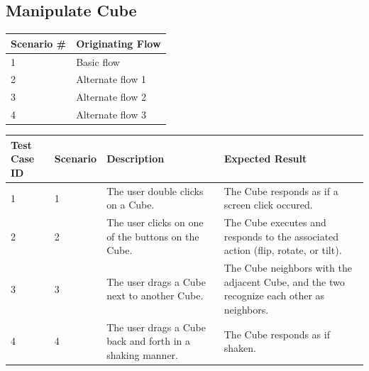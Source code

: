 \documentclass[12pt]{article}
\begin{document}
\clearpage

\subsection{Manipulate Cube}

\begin{table}[h!]
  \begin{tabular}{l | l}
    \textbf{Scenario \#} &
    \textbf{Originating Flow} \\ \hline

    1 &
    Basic flow \\ \hline

    2 &
    Alternate flow 1 \\ \hline

    3 &
    Alternate flow 2 \\ \hline

    4 &
    Alternate flow 3 \\ \hline

  \end{tabular}
\end{table}

\begin{table}[h!]
  \begin{tabular}{p{.5in} | p{.75in} | p{2.15in} | p{2.15in}}
    \textbf{Test Case ID} &
    \textbf{Scenario} &
    \textbf{Description} &
    \textbf{Expected Result} \\ \hline

    1 &
    1 &
    The user double clicks on a Cube. &
    The Cube responds as if a screen click occured. \\ \hline

    2 &
    2 &
    The user clicks on one of the buttons on the Cube. &
    The Cube executes and responds to the associated action (flip, rotate, or tilt). \\ \hline

    3 &
    3 &
    The user drags a Cube next to another Cube. &
    The Cube neighbors with the adjacent Cube, and the two recognize each other as neighbors. \\ \hline

    4 &
    4 &
    The user drags a Cube back and forth in a shaking manner. &
    The Cube responds as if shaken. \\ \hline

  \end{tabular}
\end{table}
        
\end{document}
